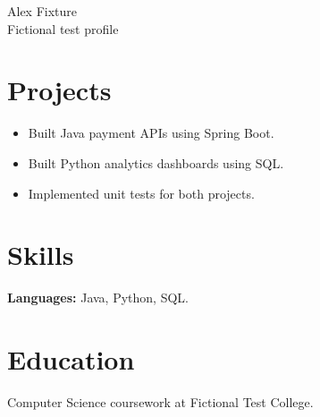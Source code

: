 \documentclass[11pt]{article}
\newcommand{\resumeItem}[1]{\item #1}
\begin{document}
\begin{center}
{\Large Alex Fixture}\\
Fictional test profile
\end{center}
\section*{Projects}
\begin{itemize}
\resumeItem{Built Java payment APIs using Spring Boot.}
\resumeItem{Built Python analytics dashboards using SQL.}
\resumeItem{Implemented unit tests for both projects.}
\end{itemize}
\section*{Skills}
\textbf{Languages:} Java, Python, SQL.\\
\section*{Education}
Computer Science coursework at Fictional Test College.
\end{document}
